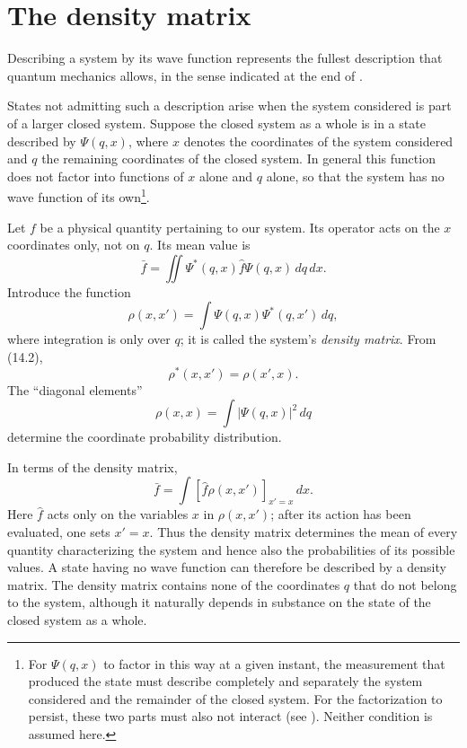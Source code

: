 \section{The density matrix}

Describing a system by its wave function represents the fullest description
that quantum mechanics allows, in the sense indicated at the end of .

States not admitting such a description arise when the system considered is
part of a larger closed system. Suppose the closed system as a whole is in a
state described by $\Psi(q,x)$, where $x$ denotes the coordinates of the
system considered and $q$ the remaining coordinates of the closed system. In
general this function does not factor into functions of $x$ alone and $q$
alone, so that
the system has no wave function of its own\footnote{For $\Psi(q,x)$ to factor
in this way at a given instant, the measurement that produced the state must
describe completely and separately the system considered and the remainder of
the closed system. For the factorization to persist, these two parts must also
not interact (see ). Neither condition is assumed here.}.

Let $f$ be a physical quantity pertaining to our system. Its operator acts on
the $x$ coordinates only, not on $q$. Its mean value is
\begin{equation}
 \bar f=\iint\Psi^*(q,x)\hat f\Psi(q,x)\,dq\,dx.
 \tag{14.1}
\end{equation}
Introduce the function
\begin{equation}
 \rho(x,x')=\int\Psi(q,x)\Psi^*(q,x')\,dq,
 \tag{14.2}
\end{equation}
where integration is only over $q$; it is called the system's \textit{density
matrix}. From (14.2),
\begin{equation}
 \rho^*(x,x')=\rho(x',x).
 \tag{14.3}
\end{equation}
The ``diagonal elements''
\[
 \rho(x,x)=\int|\Psi(q,x)|^2\,dq
\]
determine the coordinate probability distribution.

In terms of the density matrix,
\begin{equation}
 \bar f=\int[\hat f\rho(x,x')]_{x'=x}\,dx.
 \tag{14.4}
\end{equation}
Here $\hat f$ acts only on the variables $x$ in $\rho(x,x')$; after its action
has been evaluated, one sets $x'=x$. Thus the density matrix determines the
mean of every quantity characterizing the system and hence also the
probabilities of its possible values. A state having no wave function can
therefore be described by a density matrix. The density matrix contains none
of the coordinates $q$ that do not belong
to the system, although it naturally depends in substance on the state of the
closed system as a whole.

